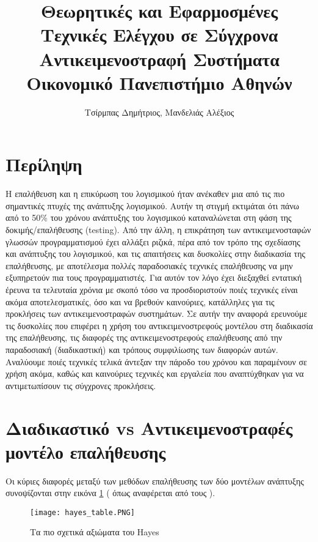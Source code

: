 \documentclass[12pt]{article}
\title{Θεωρητικές και Εφαρμοσμένες Τεχνικές Ελέγχου σε Σύγχρονα Αντικειμενοστραφή Συστήματα\\\large Οικονομικό Πανεπιστήμιο Αθηνών}
\author{Τσίρμπας Δημήτριος, Μανδελιάς Αλέξιος}
\begin{document}
\begin{titlepage}
\maketitle
\end{titlepage}

\tableofcontents
\newpage

\section{Περίληψη}

Η επαλήθευση και η επικύρωση του λογισμικού ήταν ανέκαθεν μια από τις πιο σημαντικές πτυχές της ανάπτυξης λογισμικού. Αυτήν τη στιγμή εκτιμάται ότι πάνω από το 50\% του χρόνου ανάπτυξης του λογισμικού καταναλώνεται στη φάση της δοκιμής/επαλήθευσης (testing). Από την άλλη, η επικράτηση των αντικειμενοσταφών γλωσσών προγραμματισμού έχει αλλάξει ριζικά, πέρα από τον τρόπο της σχεδίασης και ανάπτυξης του λογισμικού, και τις απαιτήσεις και δυσκολίες στην διαδικασία της επαλήθευσης, με αποτέλεσμα πολλές παραδοσιακές τεχνικές επαλήθευσης να μην εξυπηρετούν πια τους προγραμματιστές. Για αυτόν τον λόγο έχει διεξαχθεί εντατική έρευνα τα τελευταία χρόνια με σκοπό τόσο να προσδιοριστούν ποιές τεχνικές είναι ακόμα αποτελεσματικές, όσο και να βρεθούν καινούριες, κατάλληλες για τις προκλήσεις των αντικειμενοστραφών συστημάτων. Σε αυτήν την αναφορά ερευνούμε τις δυσκολίες που επιφέρει η χρήση του αντικειμενοστρεφούς μοντέλου στη διαδικασία της επαλήθευσης, τις διαφορές της αντικειμενοστρεφούς επαλήθευσης από την παραδοσιακή (διαδικαστική) και τρόπους συμφιλίωσης των διαφορών αυτών. Αναλύουμε ποιές τεχνικές τελικά άντεξαν την πάροδο του χρόνου και παραμένουν σε χρήση ακόμα, καθώς και καινούριες τεχνικές και εργαλεία που αναπτύχθηκαν για να αντιμετωπίσουν τις σύγχρονες προκλήσεις.

\section{Διαδικαστικό vs Αντικειμενοστραφές μοντέλο επαλήθευσης}

\par Οι κύριες διαφορές μεταξύ των μεθόδων επαλήθευσης των δύο μοντέλων ανάπτυξης συνοψίζονται στην εικόνα \ref{fig:hayes_table} (\textcite{hayes}  όπως αναφέρεται από τους \textcite{gordon}).

\begin{figure}
\label{fig:hayes_table}
\caption{Τα πιο σχετικά αξιώματα του Hayes}
\texttt{[image: hayes\_table.PNG]}
\end{figure}
\end{document}
